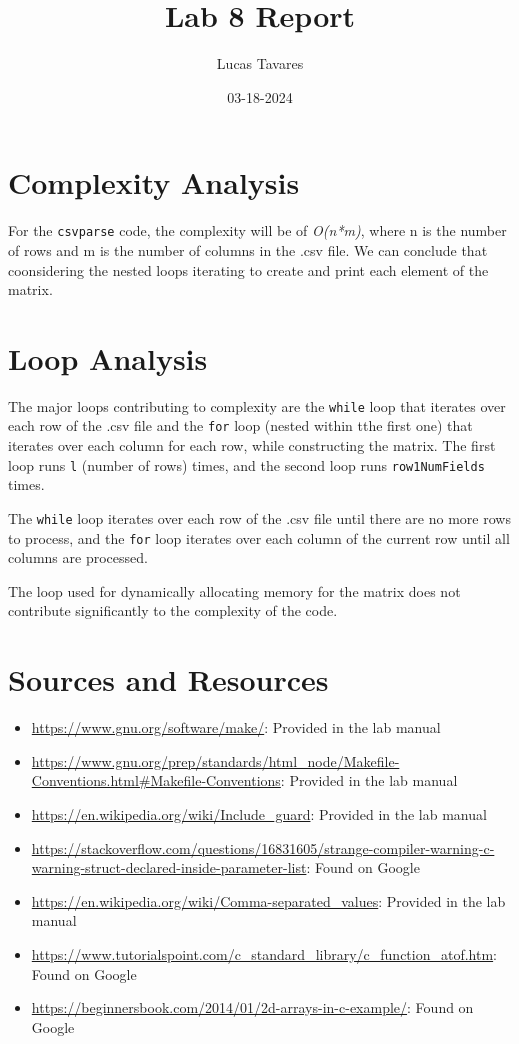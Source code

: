 \documentclass{article}
\title{Lab 8 Report}
\date{03-18-2024}
\author{Lucas Tavares}
\begin{document}
\maketitle


\newpage

\section{Complexity Analysis}

For the \texttt{csvparse} code, the complexity will be of \textit{O(n*m)}, where n is the number of rows and m is the number of columns in the .csv file. We can conclude that coonsidering the nested loops iterating to create and print each element of the matrix.

\section{Loop Analysis}

The major loops contributing to complexity are the \texttt{while} loop that iterates over each row of the .csv file and the \texttt{for} loop (nested within tthe first one) that iterates over each column for each row, while constructing the matrix. The first loop runs \texttt{l} (number of rows) times, and the second loop runs \texttt{row1NumFields} times.

The \texttt{while} loop iterates over each row of the .csv file until there are no more rows to process, and the \texttt{for} loop iterates over each column of the current row until all columns are processed.

The loop used for dynamically allocating memory for the matrix does not contribute significantly to the complexity of the code.


\newpage

\section{Sources and Resources}

\begin{flushleft}
\begin{itemize}
    \item{\url{https://www.gnu.org/software/make/}: Provided in the lab manual}
    \item{\url{https://www.gnu.org/prep/standards/html_node/Makefile-Conventions.html#Makefile-Conventions}: Provided in the lab manual}
    \item{\url{https://en.wikipedia.org/wiki/Include_guard}: Provided in the lab manual}
    \item{\url{https://stackoverflow.com/questions/16831605/strange-compiler-warning-c-warning-struct-declared-inside-parameter-list}: Found on Google}
    \item{\url{https://en.wikipedia.org/wiki/Comma-separated_values}: Provided in the lab manual}
    \item{\url{https://www.tutorialspoint.com/c_standard_library/c_function_atof.htm}: Found on Google}
    \item{\url{https://beginnersbook.com/2014/01/2d-arrays-in-c-example/}: Found on Google}
\end{itemize}
\end{flushleft}
\end{document}

